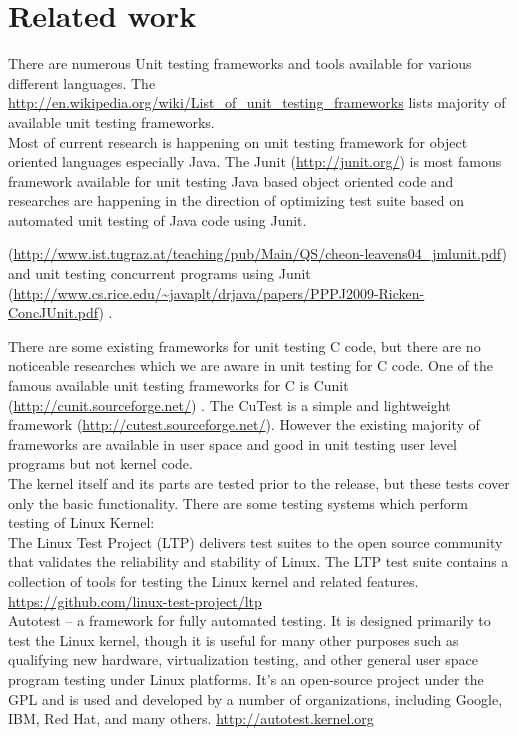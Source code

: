 
 \section{Related work}\vspace{3 mm}

There are numerous Unit testing frameworks and tools available for various different languages.  The \url{http://en.wikipedia.org/wiki/List_of_unit_testing_frameworks} lists majority of available unit testing frameworks.  \\
Most of current research is happening on unit testing framework for object oriented languages especially Java.  The Junit (\url{http://junit.org/}) is most famous framework available for unit testing Java based object oriented code and researches are happening in the direction of optimizing test suite based on automated unit testing of Java code using Junit.\\
\begin{sloppypar}
(\url{http://www.ist.tugraz.at/teaching/pub/Main/QS/cheon-leavens04_jmlunit.pdf}) and unit testing concurrent programs using Junit (\url{http://www.cs.rice.edu/~javaplt/drjava/papers/PPPJ2009-Ricken-ConcJUnit.pdf}) .\\
\end{sloppypar}
There are some existing frameworks for unit testing C code, but there are no noticeable researches which we are aware in unit testing for C code.  One of the famous available unit testing frameworks for C is Cunit (\url{http://cunit.sourceforge.net/}) . The CuTest is a simple and lightweight framework (\url{http://cutest.sourceforge.net/}).   However the existing majority of frameworks are available in user space and good in unit testing user level programs but not kernel code.   \\
The kernel itself and its parts are tested prior to the release, but these tests cover only the basic functionality. There are some testing systems which perform testing of Linux Kernel:\\

The Linux Test Project (LTP) delivers test suites to the open source community that validates the reliability and stability of Linux. The LTP test suite contains a collection of tools for testing the Linux kernel and related features. \url{https://github.com/linux-test-project/ltp} \\

Autotest -- a framework for fully automated testing. It is designed primarily to test the Linux kernel, though it is useful for many other purposes such as qualifying new hardware, virtualization testing, and other general user space program testing under Linux platforms. It's an open-source project under the GPL and is used and developed by a number of organizations, including Google, IBM, Red Hat, and many others. \url{http://autotest.kernel.org} \\


